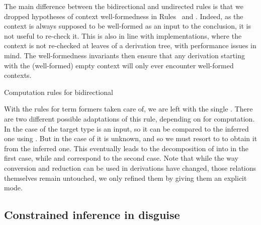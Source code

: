 The main difference between the bidirectional and undirected rules is that we dropped
hypotheses of context well-formedness in Rules~ and
. Indeed, as the context is always supposed to be well-formed
as an input to the conclusion, it is not useful to re-check it. This is also in line with implementations, where the context is not re-checked at leaves of a derivation tree, with performance issues in mind. The well-formedness invariants then ensure that any derivation starting with the (well-formed) empty context will only ever encounter well-formed contexts.

\begin{marginfigure}
\ContinuedFloat
{}
\caption{Computation rules for bidirectional }
\end{marginfigure}

With the rules for term formers taken care of,
we are left with the single .
There are two different possible adaptations of this rule, depending on
 for computation.
In the case of  the target type is an input, so
it can be compared to the inferred one using .
But in the case of  it is unknown, and so
we must resort to  to obtain it from the inferred one.
This eventually leads to the decomposition of  into
 in the first case, while
 and  correspond to the second case.
Note that while the way conversion and reduction can be used in derivations have changed,
those relations themselves remain untouched,
we only refined them by giving them an explicit mode.

\subsection{Constrained inference in disguise}

